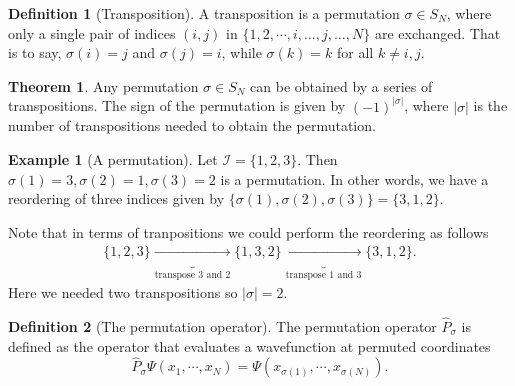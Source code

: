 \documentclass[a4paper,10pt]{article}
\theoremstyle{definition}
\newtheorem{definition}{Definition}
\newtheorem{theorem}{Theorem}
\newtheorem{example}{Example}
\begin{document}
\begin{definition}[Transposition]
 A transposition is a permutation $\sigma \in S_N$, where only a single pair of indices $(i,j)$ in 
 $\{ 1, 2,\cdots, i, \dots, j,\dots, N \}$ are exchanged. 
 That is to say, $\sigma(i) = j$ and $\sigma(j) = i$, while $\sigma(k) = k$ for all $k \neq i,j$.
\end{definition}

\begin{theorem}
 Any permutation $\sigma \in S_N$ can be obtained by a series of transpositions. The sign of the permutation is 
 given by $(-1)^{|\sigma|}$, where $|\sigma|$ is the number of transpositions needed to obtain the permutation. 
\end{theorem}

\begin{example}[A permutation]
 Let $\mathcal{I} = \{1,2,3 \}$. Then $\sigma(1) = 3, \sigma(2) = 1, \sigma(3) = 2$ is 
 a permutation. In other words, we have a reordering of three indices given by
 $\{ \sigma(1), \sigma(2), \sigma(3) \} = \{ 3,1,2 \}$.
 
 Note that in terms of tranpositions we could perform the reordering as follows 
 \begin{align*}
  \{ 1,2,3 \} \underbrace{\rightarrow}_\text{transpose $3$ and $2$} \{ 1,3,2 \} \underbrace{\rightarrow}_\text{transpose $1$ and $3$} \{ 3,1,2 \}.
 \end{align*}
 Here we needed two transpositions so $|\sigma| = 2$. 
\end{example}

\begin{definition}[The permutation operator]
 The permutation operator $\hat{P}_\sigma$ is defined as the operator that evaluates a wavefunction 
 at permuted coordinates
 \begin{equation}
  \hat{P}_\sigma \Psi(x_1,\cdots,x_N) = \Psi(x_{\sigma(1)},\cdots,x_{\sigma(N)}) \label{PermutationOperator}.
 \end{equation}
\end{definition}
\end{document}
